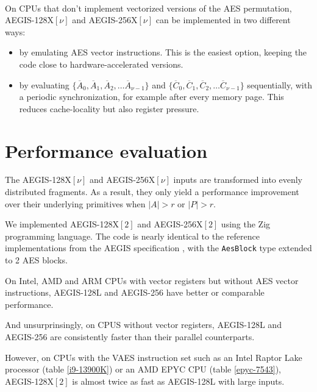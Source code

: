 \documentclass[envcountsame,runningheads,notitlepage]{llncs}
\begin{document}
\paragraph{}

On CPUs that don't implement vectorized versions of the AES permutation, AEGIS-128X$[\nu]$ and AEGIS-256X$[\nu]$ can be implemented in two different ways:

\begin{itemize}
  \item by emulating AES vector instructions. This is the easiest option, keeping the code close to hardware-accelerated versions.
  \item by evaluating $\{ \overline{A}_0, \overline{A}_1, \overline{A}_2, \ldots \overline{A}_{\nu-1} \}$ and $\{ \overline{C}_0, \overline{C}_1, \overline{C}_2, \ldots \overline{C}_{\nu-1} \}$ sequentially, with a periodic synchronization, for example after every memory page. This reduces cache-locality but also register pressure.
\end{itemize}

\section{Performance evaluation}
\label{sec:performance evaluation}

The AEGIS-128X$[\nu]$ and AEGIS-256X$[\nu]$ inputs are transformed into evenly distributed fragments.
As a result, they only yield a performance improvement over their underlying primitives when $\lvert A \rvert > r$ or $\lvert P \rvert > r$.

We implemented AEGIS-128X$[2]$ and AEGIS-256X$[2]$ using the Zig programming language. The code \cite{GitHub:AEGISX} is nearly identical to the reference implementations from the AEGIS specification \cite{DSL2023}, with the \lstinline{AesBlock} type extended to 2 AES blocks.

On Intel, AMD and ARM CPUs with vector registers but without AES vector instructions, AEGIS-128L and AEGIS-256 have better or comparable performance.

And unsurprinsingly, on CPUS without vector registers, AEGIS-128L and AEGIS-256 are consistently faster than their parallel counterparts.

However, on CPUs with the VAES instruction set such as an Intel Raptor Lake processor (table \ref{i9-13900K}) or an AMD EPYC CPU (table \ref{epyc-7543}), AEGIS-128X$[2]$ is almost twice as fast as AEGIS-128L with large inputs.
\end{document}
